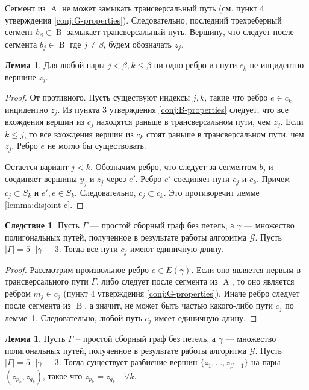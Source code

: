 \documentclass{article}
\theoremstyle{definition}
\newtheorem{lemma}[theorem]{Лемма}
\newtheorem{corollary}[theorem]{Следствие}
\newcommand{\G}{\mathcal{G}}
\newcommand{\A}{\operatorname{A}}
\newcommand{\B}{\operatorname{B}}
\begin{document}
Сегмент из $\A$ не может замыкать трансверсальный путь (см. пункт 4 утверждения \ref{conj:G-properties}). 
Следовательно, последний трехреберный сегмент $b_{\beta} \in \B$ замыкает трансверсальный путь. Вершину, что следует после сегмента $b_j \in \B$ где $j \neq \beta$, будем обозначать $z_j$.

\begin{lemma}\label{lemma:z-properties}
    Для любой пары $j < \beta, k \leq \beta$ ни одно ребро из пути $c_k$ не инцидентно вершине $z_j$.
\end{lemma}

\begin{proof}
    От противного. Пусть существуют индексы $j,k$, такие что ребро $e \in c_k$ инцидентно $z_j$. Из пункта 3 утверждения \ref{conj:B-properties} следует, что все вхождения вершин из $c_j$ находятся раньше в трансверсальном пути, чем $z_j$. Если $k \leq j$, то все вхождения вершин из $c_k$ стоят раньше в трансверсальном пути, чем $z_j$. Ребро $e$ не могло бы существовать.
    
    Остается вариант $j < k$. Обозначим ребро, что следует за сегментом $b_j$ и соединяет вершины $y_j$ и $z_j$ через $e'$. Ребро $e'$ соединяет пути $c_j$ и $c_k$. Причем $c_j\subset S_k$ и $e', e \in S_k$. Следовательно, $c_j \subset c_k$. Это противоречит лемме \ref{lemma:disjoint-c}.
\end{proof}

\begin{corollary}
    Пусть $\Gamma$ --- простой сборный граф без петель, а $\gamma$ — множество полигональных путей, полученное в результате работы алгоритма $\G$. Пусть $|\Gamma| = 5\cdot |\gamma| - 3$. Тогда все пути $c_j$ имеют единичную длину.
\end{corollary}

\begin{proof}
    Рассмотрим произвольное ребро $e \in E(\gamma)$. Если оно является первым в трансверсального пути $\Gamma$, либо следует после сегмента из $\A$, то оно является ребром $m_j \in c_j$ (пункт 4 утверждения \ref{conj:G-properties}). Иначе ребро следует после сегмента из $\B$, а значит, не может быть частью какого-либо пути $c_j$ по лемме~\ref{lemma:z-properties}. Следовательно, любой путь $c_j$ имеет единичную длину.
\end{proof}

\begin{lemma}
    Пусть $\Gamma$ -- простой сборный граф без петель, а $\gamma$ — множество полигональных путей, полученное в результате работы алгоритма $\G$. Пусть $|\Gamma| = 5\cdot |\gamma| - 3$. Тогда существует разбиение вершин $\{z_1,\ldots, z_{\beta - 1}\}$ на пары $(z_{p_k}, z_{q_k})$, такое что $z_{p_k} = z_{q_k} \quad \forall k$.
\end{lemma}
\end{document}
